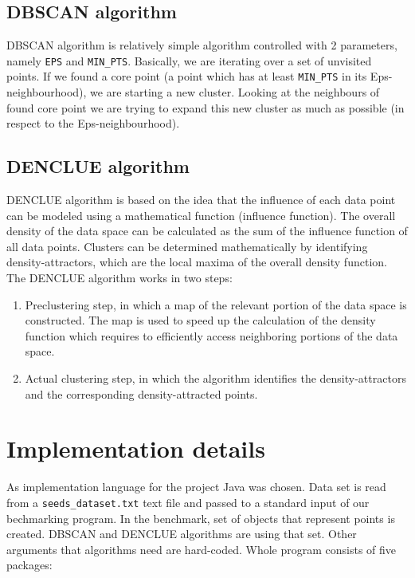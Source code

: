 \documentclass[12pt, a4paper, notitlepage, oneside]{article}
\begin{document}
\subsection{DBSCAN algorithm}

DBSCAN algorithm is relatively simple algorithm controlled with 2 parameters, namely \texttt{EPS} and \texttt{MIN\_PTS}. \cite{dbscan}
Basically, we are iterating over a set of unvisited points. If we found a core point (a point which has
at least \texttt{MIN\_PTS} in its Eps-neighbourhood), we are starting a new cluster. Looking at the neighbours 
of found core point we are trying to expand this new cluster as much as possible (in respect to the Eps-neighbourhood).

\subsection{DENCLUE algorithm}

DENCLUE algorithm is based on the idea that the influence of each data point can be modeled using a mathematical function (influence function). The overall density of the data space can be calculated as the sum of the influence function of all data points. Clusters can be determined mathematically by identifying density-attractors, which are the local maxima of the overall density function. The DENCLUE algorithm works in two steps:

\begin{enumerate}
	\item Preclustering step, in which a map of the relevant portion of the data space is constructed. The map is used to speed up the calculation of the density function which requires to efficiently access neighboring portions of the data space. 
	
	\item Actual clustering step, in which the algorithm identifies the density-attractors and the corresponding density-attracted points.
\end{enumerate}

\section{Implementation details}

As implementation language for the project Java was chosen.
Data set is read from a \texttt{seeds\_dataset.txt} text file and passed to a standard input of our bechmarking program.
In the benchmark, set of objects that represent points is created. 
DBSCAN and DENCLUE algorithms are using that set.
Other arguments that algorithms need are hard-coded. Whole program consists of five packages:
\end{document}
